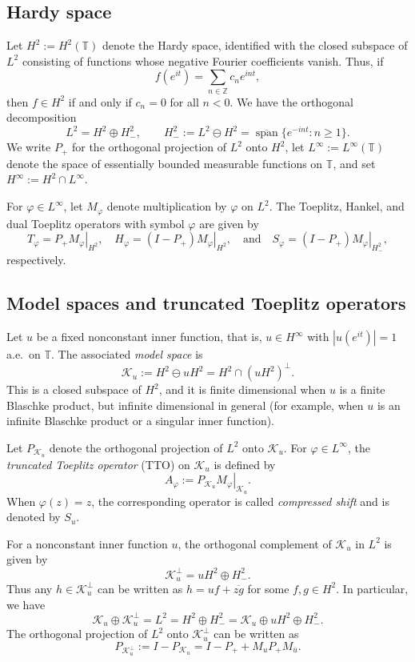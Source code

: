 \documentclass[12pt]{amsart}
\theoremstyle{definition}
\theoremstyle{remark}
\def \Z{\mathbb{Z}}
\def \T{\mathbb{T}}
\newcommand{\clk}{\mathcal{K}}
\newcommand{\vp}{\varphi}
\newcommand\restr[2]{\ensuremath{\left.#1\right|_{#2}}}
\numberwithin{equation}{section}
\begin{document}
\subsection{Hardy space}
Let $H^2:=H^2(\T)$ denote the Hardy space, identified with the closed
subspace of $L^2$ consisting of functions whose negative Fourier coefficients vanish. Thus, if
\[
f(e^{it})=\sum_{n\in\Z}c_ne^{int},
\]
then $f\in H^2$ if and only if $c_n=0$ for all $n<0$. We have the
orthogonal decomposition
\[
L^2=H^2\oplus H^2_{-},
\qquad
H^2_{-}:=L^2\ominus H^2
=\overline{\operatorname{span}}\{e^{-int}:n\ge1\}.
\]
We write $P_{+}$ for the orthogonal projection of $L^2$ onto $H^2$,
let $L^\infty:=L^\infty(\T)$ denote the space of essentially bounded
measurable functions on $\T$, and set $H^\infty:=H^2\cap L^\infty$.


For $\vp\in L^\infty$, let $M_\vp$ denote multiplication by $\vp$ on
$L^2$. The Toeplitz, Hankel, and dual Toeplitz operators with symbol
$\vp$ are given by
\[
T_\vp=\restr{P_{+}M_\vp}{H^2},
\quad
H_\vp=\restr{(I-P_{+})M_\vp}{H^2},
\quad\text{and}\quad
S_\vp=\restr{(I-P_{+})M_\vp}{H^2_{-}},
\]
respectively.


\subsection{Model spaces and truncated Toeplitz operators}

Let $u$ be a fixed nonconstant inner function, that is, $u\in H^\infty$ with $|u(e^{it})|=1$ a.e.\ on $\T$. The associated \emph{model space} is
\[
\clk_u := H^2 \ominus uH^2 = H^2\cap(uH^2)^\perp.
\]
This is a closed subspace of $H^2$, and it is finite dimensional when $u$ is a finite Blaschke product, but infinite dimensional in general (for example, when $u$ is an infinite Blaschke product or a singular inner function).

Let $P_{\clk_u}$ denote the orthogonal projection of $L^2$ onto $\clk_u$. For $\vp\in L^\infty$, the \emph{truncated Toeplitz operator} (TTO) on $\clk_u$ is defined by
$$
A_\vp := P_{\clk_u} \restr{M_\vp}{\clk_u}.
$$
When $\vp(z)=z$, the corresponding operator is called \emph{compressed shift} and is denoted by $S_u$.

For a nonconstant inner function $u$, the orthogonal complement of $\clk_u$ in $L^2$ is given by
$$
\clk_u^\perp = uH^2 \oplus H^2_{-}.
$$
Thus any $h\in \clk_u^\perp$ can be written as $h = uf + \overline{zg}$ for some $f,g\in H^2$. In particular, we have
$$
\clk_u\oplus \clk_u^\perp = L^2
= H^2\oplus H^2_{-}
= \clk_u\oplus uH^2\oplus H^2_{-}.
$$
The orthogonal projection of $L^2$ onto $\clk_u^\perp$ can be written as
\begin{equation}\label{eq:ortho-model-projection}
P_{\clk_u^\perp} := I - P_{\clk_u} = I - P_{+} + M_u P_{+} M_{\overline{u}}.
\end{equation}
\end{document}
